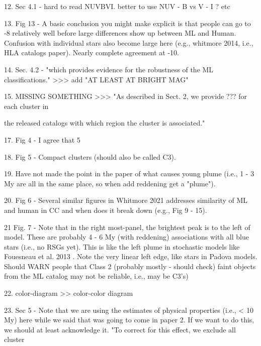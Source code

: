  

12. Sec 4.1 - hard to read NUVBVI. better to use NUV - B vs V - I ? etc

 

13. Fig 13 -  A basic conclusion you might make explicit is that people can go to -8 relatively well before large differences show up between  ML and Human. Confusion with individual stars also become large here (e.g., whitmore 2014, i.e., HLA catalogs paper).  Nearly complete agreement at -10. 

 

14. Sec. 4.2 - "which provides evidence for the robustness of the ML classifications." >>> add "AT LEAST AT BRIGHT MAG"

 

15. MISSING SOMETHING >>> "As described in Sect. 2, we provide  ??? for each cluster in

the released catalogs with which region the cluster is associated."

 

17. Fig 4 - I agree that 5 %

 

18. Fig 5 - Compact clusters (should also be called C3).

 

19. Have not made the point in the paper of what causes young plume (i.e., 1 - 3 My are all in the same place, so when add  reddening get a "plume").

 

20. Fig 6 - Several similar figures in Whitmore 2021 addresses similarity of ML and human in CC and when does it break down (e.g., Fig 9 - 15).

 

21 Fig. 7 - Note that in the right most-panel, the brightest peak is to the left of model. These are probably 4 - 6 My (with reddening) associations with all blue stars (i.e., no RSGs yet). This is like the left plume in stochastic models like Fouesneau et al. 2013 . Note the very linear left edge, like stars in Padova models. Should WARN people that Class 2 (probably mostly - should check) faint objects from the ML catalog may not be reliable, i.e., may be C3's)

 

22. color-diagram >> color-color diagram

 

23.  Sec 5 - Note that we are using the estimates of physical properties (i.e., < 10 My) here while we said that was going to come in paper 2. If we want to do this, we should at least acknowledge it.  "To correct for this effect, we exclude all cluster

